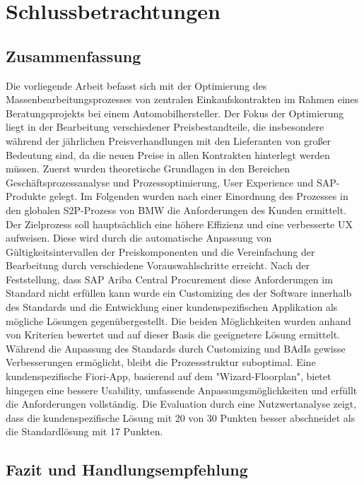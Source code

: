 \chapter{Schlussbetrachtungen}

\section{Zusammenfassung}

Die vorliegende Arbeit befasst sich mit der Optimierung des Massenbearbeitungsprozesses von zentralen Einkaufskontrakten im Rahmen eines Beratungsprojekts bei einem Automobilhersteller. Der Fokus der Optimierung liegt in der Bearbeitung verschiedener Preisbestandteile, die insbesondere während der jährlichen Preisverhandlungen mit den Lieferanten von gro\ss er Bedeutung sind, da die neuen Preise in allen Kontrakten hinterlegt werden müssen. Zuerst wurden theoretische Grundlagen in den Bereichen Geschäftsprozessanalyse und Prozessoptimierung, User Experience und SAP-Produkte gelegt. Im Folgenden wurden nach einer Einordnung des Prozesses in den globalen S2P-Prozess von BMW die Anforderungen des Kunden ermittelt. Der Zielprozess soll hauptsächlich eine höhere Effizienz und eine verbesserte UX aufweisen. Diese wird durch die automatische Anpassung von Gültigkeitsintervallen der Preiskomponenten und die Vereinfachung der Bearbeitung durch verschiedene Vorauswahlschritte erreicht. Nach der Feststellung, dass SAP Ariba Central Procurement diese Anforderungen im Standard nicht erfüllen kann wurde ein Customizing des der Software innerhalb des Standards und die Entwicklung einer kundenspezifischen Applikation als mögliche Lösungen gegenübergestellt. Die beiden Möglichkeiten wurden anhand von Kriterien bewertet und auf dieser Basis die geeignetere Lösung ermittelt. Während die Anpassung des Standards durch Customizing und BAdIs gewisse Verbesserungen ermöglicht, bleibt die Prozessstruktur suboptimal. Eine kundenspezifische Fiori-App, basierend auf dem "Wizard-Floorplan", bietet hingegen eine bessere Usability, umfassende Anpassungsmöglichkeiten und erfüllt die Anforderungen vollständig. Die Evaluation durch eine Nutzwertanalyse zeigt, dass die kundenspezifische Lösung mit 20 von 30 Punkten besser abschneidet als die Standardlösung mit 17 Punkten.

\section{Fazit und Handlungsempfehlung}

